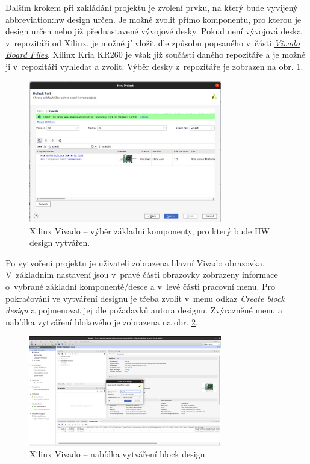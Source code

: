 \documentclass[a4paper, twoside, 11pt]{article}
\begin{document}
				Dalším krokem při zakládání projektu je zvolení prvku, na který bude vyvíjený \gls{abbreviation:hw} design určen. Je možné zvolit přímo komponentu, pro kterou je design určen nebo již přednastavené vývojové desky. Pokud není vývojová deska v~repozitáři od Xilinx, je možné jí vložit dle způsobu popsaného v~části \hyperref[subsec:vivado-board-files]{\textit{Vivado Board Files}}. Xilinx Kria KR260 je však již součástí daného repozitáře a je možné ji v~repozitáři vyhledat a zvolit. Výběr desky z~repozitáře je zobrazen na obr. \ref{fig:kr26-xilix-vivado-flow-02}.

				\begin{figure}[htbp!]
					\centering
					\includegraphics[width=0.75\textwidth]{src/png/kr26-xilinx-vivado-flow/kr26-xilix-vivado-flow-02.jpg}
					\caption{Xilinx Vivado – výběr základní komponenty, pro který bude HW design vytvářen.}
					\label{fig:kr26-xilix-vivado-flow-02}
				\end{figure}

				Po vytvoření projektu je uživateli zobrazena hlavní Vivado obrazovka. V~základním nastavení jsou v~pravé části obrazovky zobrazeny informace o~vybrané základní komponentě/desce a v~levé části pracovní menu. Pro pokračování ve vytváření designu je třeba zvolit v~menu odkaz \textit{Create block design} a pojmenovat jej dle požadavků autora designu. Zvýrazněné menu a nabídka vytváření blokového je zobrazena na obr. \ref{fig:kr26-xilix-vivado-flow-03}.
		
				\begin{figure}[htbp!]
					\centering
					\includegraphics[width=0.75\textwidth]{src/png/kr26-xilinx-vivado-flow/kr26-xilix-vivado-flow-03.jpg}
					\caption{Xilinx Vivado – nabídka vytváření block design.}
					\label{fig:kr26-xilix-vivado-flow-03}
				\end{figure}
\end{document}

